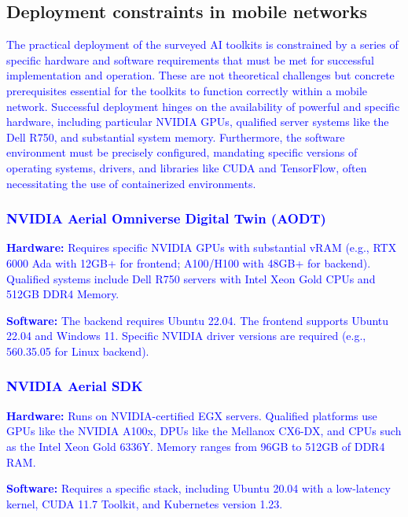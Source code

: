 \documentclass[conference]{IEEEtran}
\begin{document}
\subsection{Deployment constraints in mobile networks}

\textcolor{blue}{The practical deployment of the surveyed AI toolkits is constrained by a series of specific hardware and software requirements that must be met for successful implementation and operation. These are not theoretical challenges but concrete prerequisites essential for the toolkits to function correctly within a mobile network. Successful deployment hinges on the availability of powerful and specific hardware, including particular NVIDIA GPUs, qualified server systems like the Dell R750, and substantial system memory. Furthermore, the software environment must be precisely configured, mandating specific versions of operating systems, drivers, and libraries like CUDA and TensorFlow, often necessitating the use of containerized environments.}

\textcolor{blue}{\subsubsection{NVIDIA Aerial Omniverse Digital Twin (AODT)}}

\textcolor{blue}{\textbf{Hardware:} Requires specific NVIDIA GPUs with substantial vRAM (e.g., RTX 6000 Ada with 12GB+ for frontend; A100/H100 with 48GB+ for backend). Qualified systems include Dell R750 servers with Intel Xeon Gold CPUs and 512GB DDR4 Memory.}

\textcolor{blue}{\textbf{Software:} The backend requires Ubuntu 22.04. The frontend supports Ubuntu 22.04 and Windows 11. Specific NVIDIA driver versions are required (e.g., 560.35.05 for Linux backend).}

\textcolor{blue}{\subsubsection{NVIDIA Aerial SDK}}

\textcolor{blue}{\textbf{Hardware:} Runs on NVIDIA-certified EGX servers. Qualified platforms use GPUs like the NVIDIA A100x, DPUs like the Mellanox CX6-DX, and CPUs such as the Intel Xeon Gold 6336Y. Memory ranges from 96GB to 512GB of DDR4 RAM.}

\textcolor{blue}{\textbf{Software:} Requires a specific stack, including Ubuntu 20.04 with a low-latency kernel, CUDA 11.7 Toolkit, and Kubernetes version 1.23.}
\end{document}
